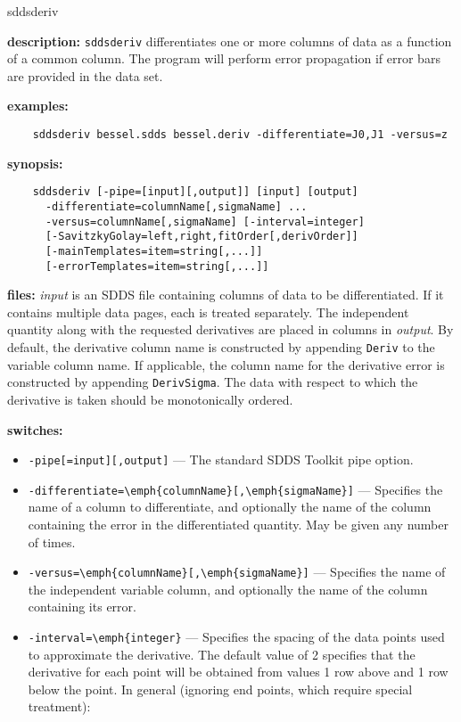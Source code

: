 \begin{sddsprog}{sddsderiv}
  \item \textbf{description:} \verb|sddsderiv| differentiates one or more columns of data as a function of a common column. The program will perform error propagation if error bars are provided in the data set.
  \item \textbf{examples:}
    \begin{verbatim}
    sddsderiv bessel.sdds bessel.deriv -differentiate=J0,J1 -versus=z
    \end{verbatim}
  \item \textbf{synopsis:}
    \begin{verbatim}
    sddsderiv [-pipe=[input][,output]] [input] [output]
      -differentiate=columnName[,sigmaName] ...
      -versus=columnName[,sigmaName] [-interval=integer]
      [-SavitzkyGolay=left,right,fitOrder[,derivOrder]]
      [-mainTemplates=item=string[,...]]
      [-errorTemplates=item=string[,...]]
    \end{verbatim}
  \item \textbf{files:} {\em input} is an SDDS file containing columns of data to be differentiated. If it contains multiple data pages, each is treated separately. The independent quantity along with the requested derivatives are placed in columns in {\em output}. By default, the derivative column name is constructed by appending \verb|Deriv| to the variable column name. If applicable, the column name for the derivative error is constructed by appending \verb|DerivSigma|. The data with respect to which the derivative is taken should be monotonically ordered.
  \item \textbf{switches:}
    \begin{itemize}
      \item \verb|-pipe[=input][,output]| --- The standard SDDS Toolkit pipe option.
      \item \verb|-differentiate=\emph{columnName}[,\emph{sigmaName}]| --- Specifies the name of a column to differentiate, and optionally the name of the column containing the error in the differentiated quantity. May be given any number of times.
      \item \verb|-versus=\emph{columnName}[,\emph{sigmaName}]| --- Specifies the name of the independent variable column, and optionally the name of the column containing its error.
      \item \verb|-interval=\emph{integer}| --- Specifies the spacing of the data points used to approximate the derivative. The default value of 2 specifies that the derivative for each point will be obtained from values 1 row above and 1 row below the point. In general (ignoring end points, which require special treatment):

\end{itemize}
\end{sddsprog}
